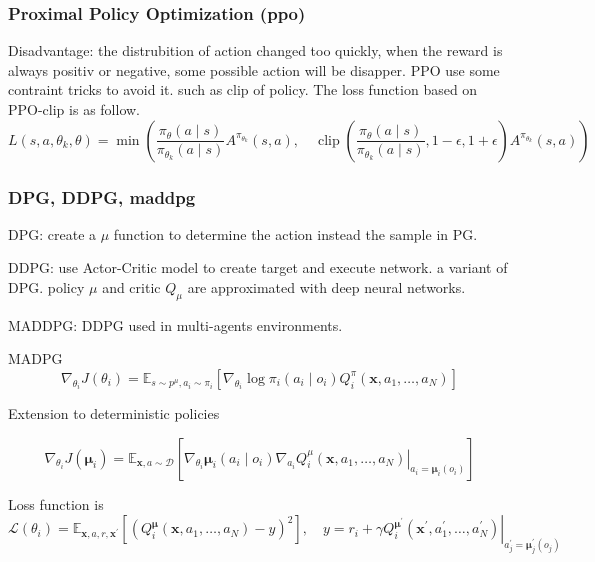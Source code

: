 \subsubsection{Proximal Policy Optimization (\gls{ppo})}
Disadvantage: the distrubition of action changed too quickly, when the reward is always positiv or negative, some possible action will be disapper.
PPO use some contraint tricks to avoid it. such as clip of policy. The loss function based on PPO-clip is as follow.
\begin{equation}
L\left(s, a, \theta_{k}, \theta\right)=\min \left(\frac{\pi_{\theta}(a \mid s)}{\pi_{\theta_{k}}(a \mid s)} A^{\pi_{\theta_{k}}}(s, a), \quad \operatorname{clip}\left(\frac{\pi_{\theta}(a \mid s)}{\pi_{\theta_{k}}(a \mid s)}, 1-\epsilon, 1+\epsilon\right) A^{\pi_{\theta_{k}}}(s, a)\right)
\end{equation} 

\subsubsection{DPG, DDPG, \gls{maddpg}}

DPG: create a $\mu$ function to determine the action instead the sample in PG.

DDPG: use Actor-Critic model to create target and execute network. a variant of DPG. policy $\mu$ and critic $Q_\mu$ are approximated with deep neural networks.

MADDPG: DDPG used in multi-agents environments.

MADPG
\begin{equation}
\nabla_{\theta_{i}} J\left(\theta_{i}\right)=\mathbb{E}_{s \sim p^{\mu}, a_{i} \sim \pi_{i}}\left[\nabla_{\theta_{i}} \log \pi_{i}\left(a_{i} \mid o_{i}\right) Q_{i}^{\pi}\left(\mathbf{x}, a_{1}, \ldots, a_{N}\right)\right]
\end{equation}

Extension to deterministic policies

\begin{equation}
\nabla_{\theta_{i}} J\left(\boldsymbol{\mu}_{i}\right)=\mathbb{E}_{\mathbf{x}, a \sim \mathcal{D}}\left[\left.\nabla_{\theta_{i}} \boldsymbol{\mu}_{i}\left(a_{i} \mid o_{i}\right) \nabla_{a_{i}} Q_{i}^{\mu}\left(\mathbf{x}, a_{1}, \ldots, a_{N}\right)\right|_{a_{i}=\boldsymbol{\mu}_{i}\left(o_{i}\right)}\right]
\end{equation}

Loss function is 
\begin{equation}
\mathcal{L}\left(\theta_{i}\right)=\mathbb{E}_{\mathbf{x}, a, r, \mathbf{x}^{\prime}}\left[\left(Q_{i}^{\boldsymbol{\mu}}\left(\mathbf{x}, a_{1}, \ldots, a_{N}\right)-y\right)^{2}\right], \quad y=r_{i}+\left.\gamma Q_{i}^{\boldsymbol{\mu}^{\prime}}\left(\mathbf{x}^{\prime}, a_{1}^{\prime}, \ldots, a_{N}^{\prime}\right)\right|_{a_{j}^{\prime}=\boldsymbol{\mu}_{j}^{\prime}\left(o_{j}\right)}
\end{equation}


